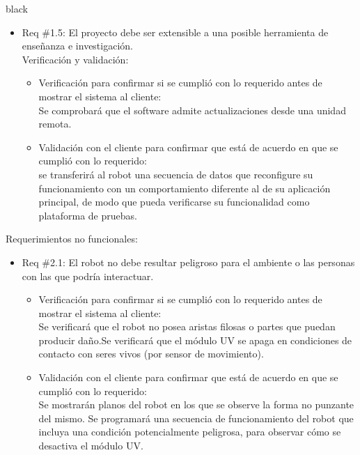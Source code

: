 \documentclass[11pt]{charter}
\begin{document}
\begin{consigna}{black}
\begin{itemize}
\item Req \#1.5: El proyecto debe ser extensible a una posible herramienta de enseñanza e investigación.\\
Verificación y validación:
\begin{itemize}
\item Verificación para confirmar si se cumplió con lo requerido antes de mostrar el
sistema al cliente:\\
Se comprobará que el software admite actualizaciones desde una unidad remota.\\
\item Validación con el cliente para confirmar que está de acuerdo en que se cumplió con lo requerido:\\ 
se transferirá al robot una secuencia de datos que reconfigure su funcionamiento con un comportamiento diferente al de su aplicación principal, de modo que pueda verificarse su funcionalidad como plataforma de pruebas.\\
\end{itemize}


\end{itemize}

Requerimientos  no funcionales:
\begin{itemize}
\item Req \#2.1: El robot no debe resultar peligroso para el ambiente o las personas con las que podría interactuar.
\begin{itemize}
\item Verificación para confirmar si se cumplió con lo requerido antes de mostrar el
sistema al cliente:\\
Se verificará que el robot no posea aristas filosas o partes que puedan producir daño.Se verificará que el módulo UV se apaga en condiciones de contacto con seres vivos (por sensor de movimiento).\\
\item Validación con el cliente para confirmar que está de acuerdo en que se cumplió con lo requerido:\\ 
Se mostrarán planos del robot en los que se observe la forma no punzante del mismo. Se programará una secuencia de funcionamiento del robot que incluya una condición potencialmente peligrosa, para observar cómo se desactiva el módulo UV.\\
\end{itemize}


\end{itemize}
\end{consigna}
\end{document}
